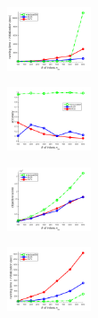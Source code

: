 \documentclass[hyperref={pdfpagelabels=false}]{beamer}
\begin{document}
\begin{frame}[allowframebreaks]
\begin{figure}[h]
\begin{subfigure}[b]{0.32\textwidth}
		\end{subfigure} 
		\begin{subfigure}[b]{0.32\textwidth}
			\centering
			\includegraphics[width=2.5cm]{"fig/evaluation/SyntheticTest_BigGraphs/descr/Results_v4.3.3/Test2/time_summary_avg1t"} 
		\end{subfigure} 	
\end{figure}
\vspace{-20pt}
\begin{figure}[h] 
		\begin{subfigure}[b]{0.32\textwidth}
			\centering
			\includegraphics[width=2.5cm]{"fig/evaluation/SyntheticTest_BigGraphs/descr/Results_v4.3.3/Test3/accuracy_avg1t"} 
		\end{subfigure}
		\begin{subfigure}[b]{0.32\textwidth}
			\centering
			\includegraphics[width=2.5cm]{"fig/evaluation/SyntheticTest_BigGraphs/descr/Results_v4.3.3/Test3/score_avg1t"} 
		\end{subfigure} 
		\begin{subfigure}[b]{0.32\textwidth}
			\centering
			\includegraphics[width=2.5cm]{"fig/evaluation/SyntheticTest_BigGraphs/descr/Results_v4.3.3/Test3/time_summary_avg1t"} 
		\end{subfigure} 	
\end{figure}
\end{frame}
\end{document}
